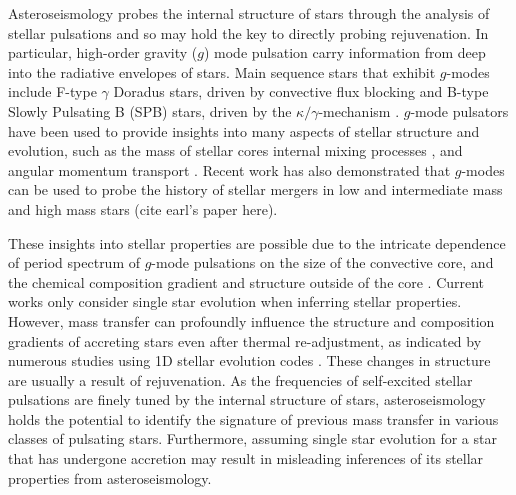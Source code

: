 \documentclass[twocolumn, twocolappendix, oneside]{aastex631}
\newcommand{\gmode}{$g$-mode\xspace}
\newcommand{\gmodes}{$g$-modes\xspace}
\begin{document}
Asteroseismology probes the internal structure of stars through the analysis of stellar pulsations \citep{Aerts+2010} and so may hold the key to directly probing rejuvenation. %
In particular, high-order gravity ($g$) mode pulsation carry information from deep into the radiative envelopes of stars. Main sequence stars that exhibit \gmodes include F-type $\gamma$ Doradus stars, driven by convective flux blocking \citep{Guzik+2000} and B-type Slowly Pulsating B (SPB) stars, driven by the $\kappa/\gamma$-mechanism \citep{Waelkens+1985, Waelkens+1991, Cox+1992, Pamyatnykh+1999}.
\gmode pulsators have been used to provide insights into many aspects of stellar structure and evolution, such as the mass of stellar cores \citep{Johnston+2021, Pedersen+2022} internal mixing processes \citep{Pedersen+2018,Michielsen+2021}, and angular momentum transport \citep{Aerts+2019,Burssens+2023,Mombarg2023}. Recent work has also demonstrated that \gmodes can be used to probe the history of stellar mergers in low and intermediate mass \citep{Rui+2021} and high mass stars (cite earl's paper here).

These insights into stellar properties are possible due to the intricate dependence of period spectrum of \gmode pulsations on the size of the convective core, and the chemical composition gradient and structure outside of the core \citep[e.g.][]{Miglio+2008,Hatta+2023}. Current works only consider single star evolution when inferring stellar properties. However, mass transfer can profoundly influence the structure and composition gradients of accreting stars even after thermal re-adjustment, as indicated by numerous studies using 1D stellar evolution codes \citep{Cantiello+2007,Renzo+2021, Miszuda+2021}. These changes in structure are usually a result of rejuvenation. As the frequencies of self-excited stellar pulsations are finely tuned by the internal structure of stars, asteroseismology holds the potential to identify the signature of previous mass transfer in various classes of pulsating stars. Furthermore, assuming single star evolution for a star that has undergone accretion may result in misleading inferences of its stellar properties from asteroseismology.
\end{document}
